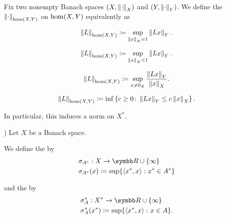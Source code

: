 \begin{definition}\label{def:dual_norm}
  Fix two nonempty Banach spaces \( (X, \left\Vert \cdot \right\Vert_X) \) and \( (Y, \left\Vert \cdot \right\Vert_Y) \). We define the  \( \left\Vert \cdot \right\Vert_{\operatorname{hom}(X, Y)} \) on \( \operatorname{hom}(X, Y) \) equivalently as
  \begin{defenum}
    \begin{equation*}
      \left\Vert L \right\Vert_{\operatorname{hom}(X, Y)} \coloneqq \sup_{\left\Vert x \right\Vert_X = 1} \left\Vert Lx \right\Vert_Y.
    \end{equation*}

    \begin{equation*}
      \left\Vert L \right\Vert_{\operatorname{hom}(X, Y)} \coloneqq \sup_{\left\Vert x \right\Vert_X < 1} \left\Vert Lx \right\Vert_Y.
    \end{equation*}

    \begin{equation*}
      \left\Vert L \right\Vert_{\operatorname{hom}(X, Y)} \coloneqq \sup_{x \neq 0_X} \frac {\left\Vert Lx \right\Vert_Y} {\left\Vert x \right\Vert_X}.
    \end{equation*}

    \begin{equation*}
      \left\Vert L \right\Vert_{\operatorname{hom}(X, Y)} \coloneqq \inf \left\{ c \geq 0 \colon \left\Vert Lx \right\Vert_Y \leq c \left\Vert x \right\Vert_X \right\}.
    \end{equation*}
  \end{defenum}

  In particular, this induces a norm on \( X^* \).
\end{definition}

\begin{definition}\label{def:banach_space_support_function}\cite[example 3.2(a)]{Phelps1993})
  Let \( X \) be a Banach space.

  We define the  by
  \begin{align*}
    &\sigma_{A^*}: X \to \BR \cup \{ \infty \} \\
    &\sigma_{A^*}(x) \coloneqq \sup \{ \Prod {x^*} x \colon x^* \in A^* \}
  \end{align*}

  and the  by
  \begin{align*}
    &\sigma^*_A: X^* \to \BR \cup \{ \infty \} \\
    &\sigma^*_A(x^*) \coloneqq \sup \{ \Prod {x^*} x \colon x \in A \}.
  \end{align*}
\end{definition}


